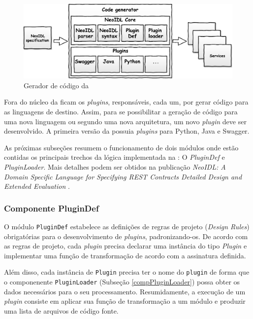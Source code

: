 \begin{figure}[h]
\begin{center}
\includegraphics[width=120mm,trim=0cm 0cm 0cm
0cm]{img/NeoIDLCodeGenerator.pdf}
\vspace{-.5cm}
\end{center}
\caption{Gerador de código da \neoidl{}}
\label{fig:programGenerator}
\end{figure}

Fora do núcleo da \neoidl{} ficam os \textit{plugins}, responsáveis,
cada um, por gerar código para as linguagens de destino. Assim, para se
possibilitar a geração de código para uma nova linguagem ou segundo uma nova arquitetura, um
novo \textit{plugin} deve ser desenvolvido. A primeira versão da \neoidl{}
possuia \textit{plugins} para Python, Java e Swagger.

As próximas subseções resumem o funcionamento de
dois módulos onde estão contidas os principais trechos da lógica implementada na \neoidl{}: O
\textit{PluginDef} e \textit{PluginLoader}. Mais detalhes podem ser obtidos na
publicação \textit{NeoIDL: A Domain Specific Language for Specifying REST
Contracts Detailed Design and Extended Evaluation} \cite{lima2015neoidl}.
 

\subsubsection{Componente PluginDef}{\label{sec:plugindef}}

O módulo \texttt{PluginDef} estabelece as definições de regras de projeto
(\textit{Design Rules}) obrigatórias para o desenvolvimento de
\textit{plugins}, padronizando-os. De acordo com as regras de projeto, cada
\textit{plugin} precisa declarar uma instância do tipo \emph{Plugin} e implementar uma função de
transformação de acordo com a assinatura definida.

Além disso, cada instância de  
\texttt{Plugin} precisa ter o nome do \texttt{plugin} de forma que o
componenente \texttt{PluginLoader} (Subseção \ref{compPluginLoader}) possa obter
os dados necessários para o seu processamento.
Resumidamente, a execução de um \textit{plugin} consiste em aplicar sua função
de transformação a um módulo \neoidl{} e produzir uma lista de
arquivos de código fonte. 


